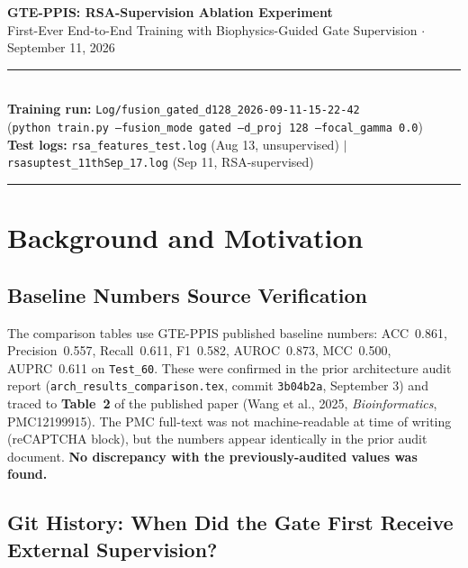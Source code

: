 \documentclass[10pt, a4paper]{article}
\newcommand{\warn}[1]{\textcolor{warnorange}{\textbf{#1}}}
\newcommand{\code}[1]{\texttt{\small #1}}
\begin{document}

\begin{center}
    {\LARGE \bfseries \color{primaryblue}
        GTE-PPIS: RSA-Supervision Ablation Experiment}\\[4pt]
    {\large \color{secondaryblue}
        First-Ever End-to-End Training with Biophysics-Guided Gate Supervision
        $\cdot$ September 11, 2026}\\[6pt]
    \rule{\textwidth}{1pt}\\[5pt]
    {\small \textbf{Training run:}
    \texttt{Log/fusion\_gated\_d128\_2026-09-11-15-22-42}}
    \\[2pt]
    {\small (\texttt{python train.py --fusion\_mode gated --d\_proj 128 --focal\_gamma 0.0})}
    \\[4pt]
    {\small \textbf{Test logs:}
    \texttt{rsa\_features\_test.log} (Aug 13, unsupervised)
    $|$
    \texttt{rsasuptest\_11thSep\_17.log} (Sep 11, RSA-supervised)}
    \rule{\textwidth}{0.5pt}
\end{center}

\vspace{4pt}

\section{Background and Motivation}

\subsection{Baseline Numbers Source Verification}

The comparison tables use GTE-PPIS published baseline numbers:
ACC~0.861, Precision~0.557, Recall~0.611, F1~0.582, AUROC~0.873, MCC~0.500,
AUPRC~0.611 on \texttt{Test\_60}.
These were confirmed in the prior architecture audit report
(\code{arch\_results\_comparison.tex}, commit \texttt{3b04b2a}, September 3)
and traced to \textbf{Table~2} of the published paper (Wang et al., 2025,
\textit{Bioinformatics}, PMC12199915).
The PMC full-text was not machine-readable at time of writing (reCAPTCHA block),
but the numbers appear identically in the prior audit document.
\warn{No discrepancy with the previously-audited values was found.}

\subsection{Git History: When Did the Gate First Receive External Supervision?}
\end{document}
